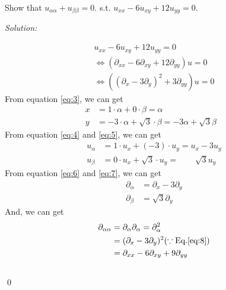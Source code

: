 \documentclass[12pt]{article}
\newenvironment{problem}[2][Problem]{\begin{trivlist}
\item[\hskip \labelsep {\bfseries #1}\hskip \labelsep {\bfseries #2.}]}{\end{trivlist}}
\newenvironment{sol}
{\emph{Solution:}
}
{
    \qed
    }
\begin{document}




\begin{problem}{1} 
Show that $u_{\alpha\alpha}+u_{\beta\beta}=0$. s.t. $u_{xx}-6u_{xy}+12u_{yy}=0$.
\end{problem}
\begin{sol}
    \begin{align}
        & u_{xx}-6u_{xy}+12u_{yy}=0 & \label{eq:1} \\
        & \Leftrightarrow (\partial_{xx}-6\partial_{xy}+12\partial_{yy})u=0 & \label{eq:2} \\
        & \Leftrightarrow ((\partial_{x}-3\partial_{y})^2+3\partial_{yy})u=0 & \label{eq:3}
    \end{align}
    From equation \eqref{eq:3}, we can get
    \begin{align}
        x & = 1 \cdot \alpha + 0 \cdot \beta = \alpha \label{eq:4} \\
        y & = -3 \cdot \alpha + \sqrt{3} \cdot \beta  = -3 \alpha + \sqrt{3} \beta& \label{eq:5}
    \end{align}
    From equation \eqref{eq:4} and \eqref{eq:5}, we can get
    \begin{align}
        u_{\alpha} & = 1 \cdot u_{x} + (-3) \cdot u_{y} = u_{x}-3 u_{y}\label{eq:6} \\
        u_{\beta} & = 0 \cdot u_{x} + \sqrt{3} \cdot u_{y} =\qquad \sqrt{3} u_{y} \label{eq:7} 
    \end{align}
    From equation \eqref{eq:6} and \eqref{eq:7}, we can get
    \begin{align}
        \partial_{\alpha} & = \partial_{x} -3 \partial_{y} \label{eq:8} \\
        \partial_{\beta} & = \sqrt{3} \partial_{y} \label{eq:9} 
    \end{align}
    And, we can get
    \begin{align}
        \partial_{\alpha\alpha} & = \partial_{\alpha} \partial_{\alpha} = \partial_{\alpha}^2 \nonumber \\
        & = (\partial_{x}-3\partial_{y})^2  (\because \textrm{Eq.} \eqref{eq:8}) \nonumber \\
        & = \partial_{xx} -6 \partial_{xy} + 9 \partial_{yy} \label{eq:10}
    \end{align}
    \begin{align}

\end{align}
\end{sol}
\end{document}
